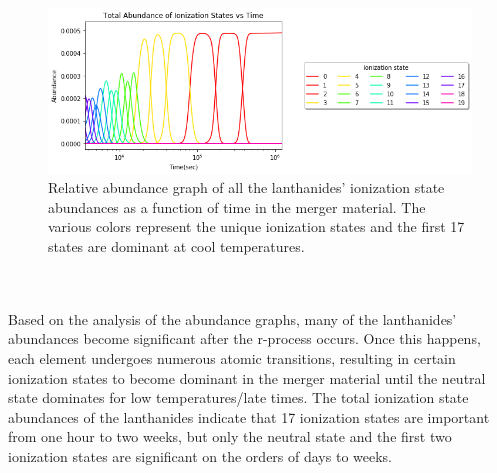 \documentclass[11pt,a4paper]{article}
\begin{document}
\begin{figure}[h!]
  \includegraphics[width=1\textwidth]{total.png}
  \setcounter{figure}{2}
  \caption{Relative abundance graph of all the lanthanides’ ionization state abundances as a function of time in the merger material. The various colors represent the unique ionization states and the first 17 states are dominant at cool temperatures.}
\end{figure}
\\\\
Based on the analysis of the abundance graphs, many of the lanthanides’ abundances become significant after the r-process occurs. Once this happens, each element undergoes numerous atomic transitions, resulting in certain ionization states to become dominant in the merger material until the neutral state dominates for low temperatures/late times. The total ionization state abundances of the lanthanides indicate that 17 ionization states are important from one hour to two weeks, but only the neutral state and the first two ionization states are significant on the orders of days to weeks. 
\end{document}
